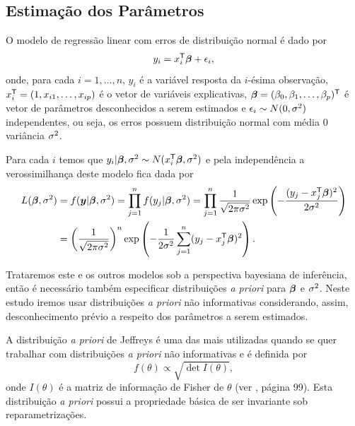 \subsection{Estimação dos Parâmetros}

O modelo de regressão linear com erros de distribuição normal é dado por
\begin{equation}
y_i = x_i^{\mathsf{T}}{\boldsymbol{\beta}} + \epsilon_i,
\end{equation}
onde, para cada $i=1,\ldots,n$, $y_i$ é a variável resposta da $i$-ésima observação, $x_i^{\mathsf{T}}=(1,x_{i1},\ldots,x_{ip})$ é o vetor de variáveis explicativas, ${\boldsymbol{\beta}}=(\beta_0,\beta_1,\ldots,\beta_p)^{\mathsf{T}}$ é vetor de parâmetros desconhecidos a serem estimados e $\epsilon_i\sim N(0,\sigma^2)$ independentes, ou seja, os erros possuem distribuição normal com média $0$ variância $\sigma^2$.

Para cada $i$ temos que $y_i|{\boldsymbol{\beta}},\sigma^2 \sim N(x_i^{\mathsf{T}}{\boldsymbol{\beta}},\sigma^2)$ e pela independência a verossimilhança deste modelo fica dada por
\begin{equation}
\begin{split}
L({\boldsymbol{\beta}},\sigma^2) &=f({\boldsymbol{y}}|{\boldsymbol{\beta}},\sigma^2)=\prod_{j=1}^nf(y_j|{\boldsymbol{\beta}},\sigma^2) =  \prod_{j=1}^n \frac{1}{\sqrt{2\pi\sigma^2}}\exp\left(-\frac{(y_j-x_j^{\mathsf{T}}{\boldsymbol{\beta}})^2}{2\sigma^2}\right) \\
{} & = \left(\frac{1}{\sqrt{2\pi\sigma^2}}\right)^n\exp\left(-\frac{1}{2\sigma^2}\sum_{j=1}^n (y_j-x_j^{\mathsf{T}}{\boldsymbol{\beta}})^2\right).
\end{split}
\end{equation}

Trataremos este e os outros modelos sob a perspectiva bayesiana de inferência, então é necessário também especificar distribuições \textit{a priori} para ${\boldsymbol{\beta}}$ e $\sigma^2$. Neste estudo iremos usar distribuições \textit{a priori} não informativas considerando, assim, desconhecimento prévio a respeito dos parâmetros a serem estimados. 

A distribuição \textit{a priori} de Jeffreys é uma das mais utilizadas quando se quer trabalhar com distribuições \textit{a priori} não informativas e é definida por
\begin{equation}
f(\theta)\propto \sqrt{\det I(\theta)},
\end{equation}
onde $I(\theta)$ é a matriz de informação de Fisher de $\theta$ (ver \citet{Paulino2003}, página 99). Esta distribuição \textit{a priori} possui a propriedade básica de ser invariante sob reparametrizações.

